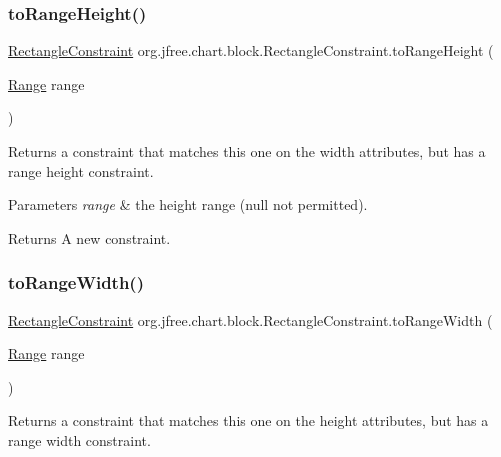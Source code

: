 \subsubsection{\texorpdfstring{to\+Range\+Height()}{toRangeHeight()}}
{\footnotesize\ttfamily \mbox{\hyperlink{classorg_1_1jfree_1_1chart_1_1block_1_1_rectangle_constraint}{Rectangle\+Constraint}} org.\+jfree.\+chart.\+block.\+Rectangle\+Constraint.\+to\+Range\+Height (\begin{DoxyParamCaption}\item[{\mbox{\hyperlink{classorg_1_1jfree_1_1data_1_1_range}{Range}}}]{range }\end{DoxyParamCaption})}

Returns a constraint that matches this one on the width attributes, but has a range height constraint.


\begin{DoxyParams}{Parameters}
{\em range} & the height range ({\ttfamily null} not permitted).\\
\hline
\end{DoxyParams}
\begin{DoxyReturn}{Returns}
A new constraint. 
\end{DoxyReturn}
\mbox{\label{classorg_1_1jfree_1_1chart_1_1block_1_1_rectangle_constraint_a306fda4215e46e5f6153c31a56b6b5b2}} 
\subsubsection{\texorpdfstring{to\+Range\+Width()}{toRangeWidth()}}
{\footnotesize\ttfamily \mbox{\hyperlink{classorg_1_1jfree_1_1chart_1_1block_1_1_rectangle_constraint}{Rectangle\+Constraint}} org.\+jfree.\+chart.\+block.\+Rectangle\+Constraint.\+to\+Range\+Width (\begin{DoxyParamCaption}\item[{\mbox{\hyperlink{classorg_1_1jfree_1_1data_1_1_range}{Range}}}]{range }\end{DoxyParamCaption})}

Returns a constraint that matches this one on the height attributes, but has a range width constraint.


